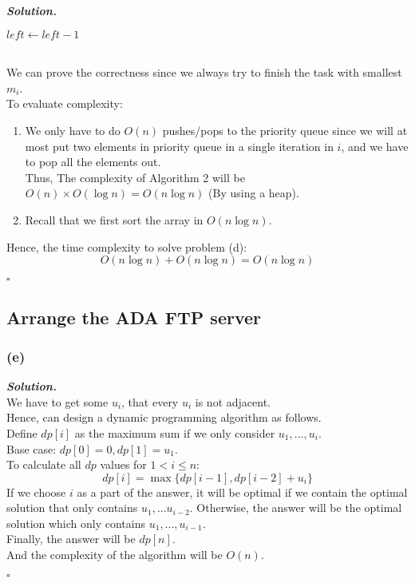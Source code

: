 \documentclass[12pt, a4paper, UTF8]{article}
\newenvironment{solution}[1][\it{Solution}]{\textbf{#1. }\\}{\begin{flushright}$\square$\end{flushright}}
\begin{document}
\begin{solution}
\begin{algorithm}
{                        $left \gets left - 1$\;
                    }
                \end{algorithm}\\
                \pagebreak
                We can prove the correctness since we always try to finish the task with smallest $m_i$.\\
                To evaluate complexity:
                \begin{enumerate}
                    \item We only have to do $O(n)$ pushes/pops to the priority queue since we will at most put two elements in priority queue in a single iteration in $i$, and we have to pop all the elements out.\\
                Thus, The complexity of Algorithm 2 will be $O(n) \times O(\log{n}) = O(n\log{n})$ (By using a heap).
                    \item Recall that we first sort the array in $O(n\log{n})$.
                \end{enumerate}
                Hence, the time complexity to solve problem (d):
                $$O(n\log{n}) + O(n\log{n}) = O(n\log{n})$$

            \end{solution}
    \subsection*{Arrange the ADA FTP server}
        \subsubsection*{(e)}
            \begin{solution}
                We have to get some {$u_i$}, that every $u_i$ is not adjacent.\\
                Hence, can design a dynamic programming algorithm as follows.\\
                Define $dp[i]$ as the maximum sum if we only consider $u_1,...,u_i$.\\
                Base case: $dp[0] = 0, dp[1] = u_1$.\\
                To calculate all $dp$ values for $1 < i \le n$:\\
                $$dp[i] = \max\{dp[i - 1], dp[i - 2] + u_i\}$$
                If we choose $i$ as a part of the answer, it will be optimal if we contain the optimal solution that only contains $u_1,...u_{i-2}$. Otherwise, the answer will be the optimal solution which only contains $u_1,...,u_{i-1}$.\\
                Finally, the answer will be $dp[n]$.\\
                And the complexity of the algorithm will be $O(n)$.
            \end{solution}
\end{document}

